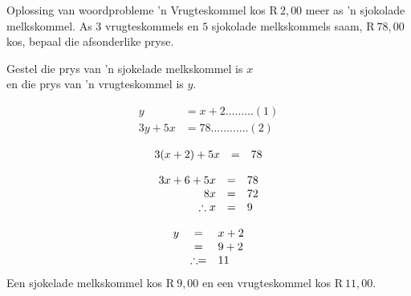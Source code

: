 \begin{wex}
{Oplossing van woordprobleme}
{
’n
Vrugteskommel kos R$~2,00$ meer as ’n sjokolade melkskommel. As $3$ vrugteskommels en $5$ sjokolade melkskommels saam,  R$~78,00$ kos,
bepaal die afsonderlike pryse.}

{
Gestel die prys van ’n sjokelade melkskommel is $x$ 
\\en die prys van ’n vrugteskommel is  $y$.


\begin{align*}
  y &= x+2  \ldots \ldots \ldots (1)\\
  3y+5x &= 78 \ldots \ldots \ldots \ldots (2)
\end{align*}

\begin{equation*}
\begin{array}{ccl}\hfill 3(x+2)+5x& =& 78\hfill \\
\end{array}
\end{equation*}

\begin{equation*}
\begin{array}{ccl}
 \hfill 3x+6+5x& =& 78\hfill \\ 
\hfill 8x& =& 72\hfill \\ 
\hfill \therefore x& =& 9\hfill \\  \end{array}
\end{equation*}

\begin{equation*}
\begin{array}{ccl}
\hfill y& =& x+2\hfill \\
 \hfill & =& 9+2\hfill \\ 
\hfill & \therefore =& 11\hfill  \end{array}
\end{equation*}
Een sjokelade melkskommel kos R$~9,00$ en een vrugteskommel
kos R$~ 11,00$.
}
\end{wex}

